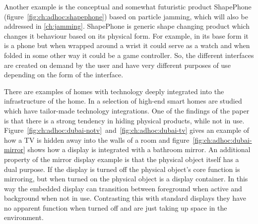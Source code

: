 Another example is the conceptual and somewhat futuristic product ShapePhone (figure~\ref{fig:ch:adhoc:shapephone}) based on particle jamming, which will also be addressed in \autoref{ch:jamming}.
ShapePhone is generic shape changing product which changes it behaviour based on its physical form.
For example, in its base form it is a phone but when wrapped around a wrist it could serve as a watch and when folded in some other way it could be a game controller.
So, the different interfaces are created on demand by the user and have very different purposes of use depending on the form of the interface.

There are examples of homes with technology deeply integrated into the infrastructure of the home.
In \citet{lynggaard2012had} a selection of high-end smart homes are studied which have tailor-made technology integrations.
One of the findings of the paper is that there is a strong tendency in hiding physical products, while not in use.
Figure~\ref{fig:ch:adhoc:dubai-notv}~and~\ref{fig:ch:adhoc:dubai-tv} gives an example of how a TV is hidden away into the walls of a room and figure~\ref{fig:ch:adhoc:dubai-mirror} shows how a display is integrated with a bathroom mirror.
An additional property of the mirror display example is that the physical object itself has a dual purpose.
If the display is turned off the physical object's core function is mirroring, but when turned on the physical object is a display container.
In this way the embedded display can transition between foreground when active and background when not in use.
Contrasting this with standard displays they have no apparent function when turned off and are just taking up space in the environment.

